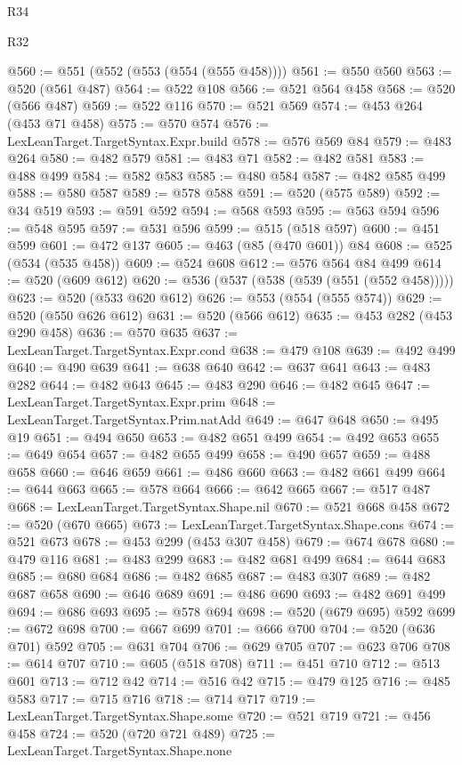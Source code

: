 \begin{lexlean}{R34}
\begin{lexlean}{R32}
\begin{coremodule}
{{{{{{{{{{{{{{{{{{{{{{{{{{{{{{{{{{{{{{{{{{{{{{{{{{{@560 := @551 (@552 (@553 (@554 (@555 @458))))
@561 := @550 @560
@563 := @520 (@561 @487)
@564 := @522 @108
@566 := @521 @564 @458
@568 := @520 (@566 @487)
@569 := @522 @116
@570 := @521 @569
@574 := @453 @264 (@453 @71 @458)
@575 := @570 @574
@576 := LexLeanTarget.TargetSyntax.Expr.build
@578 := @576 @569 @84
@579 := @483 @264
@580 := @482 @579
@581 := @483 @71
@582 := @482 @581
@583 := @488 @499
@584 := @582 @583
@585 := @480 @584
@587 := @482 @585 @499
@588 := @580 @587
@589 := @578 @588
@591 := @520 (@575 @589)
@592 := @34 @519
@593 := @591 @592
@594 := @568 @593
@595 := @563 @594
@596 := @548 @595
@597 := @531 @596
@599 := @515 (@518 @597)
@600 := @451 @599
@601 := @472 @137
@605 := @463 (@85 (@470 @601)) @84
@608 := @525 (@534 (@535 @458))
@609 := @524 @608
@612 := @576 @564 @84 @499
@614 := @520 (@609 @612)
@620 := @536 (@537 (@538 (@539 (@551 (@552 @458)))))
@623 := @520 (@533 @620 @612)
@626 := @553 (@554 (@555 @574))
@629 := @520 (@550 @626 @612)
@631 := @520 (@566 @612)
@635 := @453 @282 (@453 @290 @458)
@636 := @570 @635
@637 := LexLeanTarget.TargetSyntax.Expr.cond
@638 := @479 @108
@639 := @492 @499
@640 := @490 @639
@641 := @638 @640
@642 := @637 @641
@643 := @483 @282
@644 := @482 @643
@645 := @483 @290
@646 := @482 @645
@647 := LexLeanTarget.TargetSyntax.Expr.prim
@648 := LexLeanTarget.TargetSyntax.Prim.natAdd
@649 := @647 @648
@650 := @495 @19
@651 := @494 @650
@653 := @482 @651 @499
@654 := @492 @653
@655 := @649 @654
@657 := @482 @655 @499
@658 := @490 @657
@659 := @488 @658
@660 := @646 @659
@661 := @486 @660
@663 := @482 @661 @499
@664 := @644 @663
@665 := @578 @664
@666 := @642 @665
@667 := @517 @487
@668 := LexLeanTarget.TargetSyntax.Shape.nil
@670 := @521 @668 @458
@672 := @520 (@670 @665)
@673 := LexLeanTarget.TargetSyntax.Shape.cons
@674 := @521 @673
@678 := @453 @299 (@453 @307 @458)
@679 := @674 @678
@680 := @479 @116
@681 := @483 @299
@683 := @482 @681 @499
@684 := @644 @683
@685 := @680 @684
@686 := @482 @685
@687 := @483 @307
@689 := @482 @687 @658
@690 := @646 @689
@691 := @486 @690
@693 := @482 @691 @499
@694 := @686 @693
@695 := @578 @694
@698 := @520 (@679 @695) @592
@699 := @672 @698
@700 := @667 @699
@701 := @666 @700
@704 := @520 (@636 @701) @592
@705 := @631 @704
@706 := @629 @705
@707 := @623 @706
@708 := @614 @707
@710 := @605 (@518 @708)
@711 := @451 @710
@712 := @513 @601
@713 := @712 @42
@714 := @516 @42
@715 := @479 @125
@716 := @485 @583
@717 := @715 @716
@718 := @714 @717
@719 := LexLeanTarget.TargetSyntax.Shape.some
@720 := @521 @719
@721 := @456 @458
@724 := @520 (@720 @721 @489)
@725 := LexLeanTarget.TargetSyntax.Shape.none
}}}}}}}}}}}}}}}}}}}}}}}}}}}}}}}}}}}}}}}}}}}}}}}}}}}
\end{coremodule}
\end{lexlean}
\end{lexlean}
